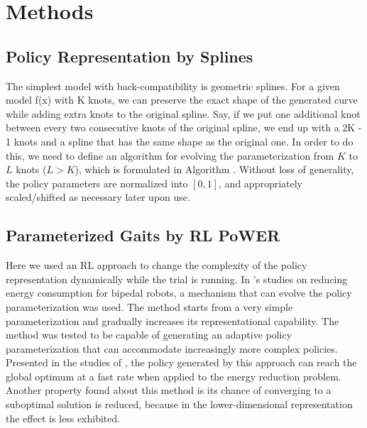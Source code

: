 \section{Methods}


\subsection{Policy Representation by Splines}

The simplest model with back-compatibility is geometric
splines. For a given model f(x) with K knots, we can preserve the
exact shape of the generated curve while adding extra knots to the
original spline. Say, if we put one additional knot between every two
consecutive knots of the original spline, we end up with a 2K - 1
knots and a spline that has the same shape as the original one. In
order to do this, we need to define an algorithm for evolving the
parameterization from $K$ to $L$ knots ($L > K$), which is formulated in
Algorithm .  Without loss of generality, the policy parameters are
normalized into $[0, 1]$, and appropriately scaled/shifted as necessary
later upon use.

\subsection{Parameterized Gaits by RL PoWER}

Here we used an RL approach to change the complexity of the policy
representation dynamically while the trial is running. In
\cite{kormushev2011bipedal-walking-energya}'s studies on reducing energy
consumption for bipedal robots, a mechanism that can
evolve the policy parameterization was used. The method starts from a
very simple parameterization and gradually increases its
representational capability. The method was tested to be capable of generating
an adaptive policy parameterization that can accommodate increasingly
more complex policies. Presented in the studies of \cite{kormushev2011bipedal-walking-energya}, the policy
generated by this approach can reach the global optimum at a fast
rate when applied to the energy reduction problem. Another property found about this method is its chance of converging to a suboptimal solution is reduced, because in the lower-dimensional representation the effect is less exhibited.


